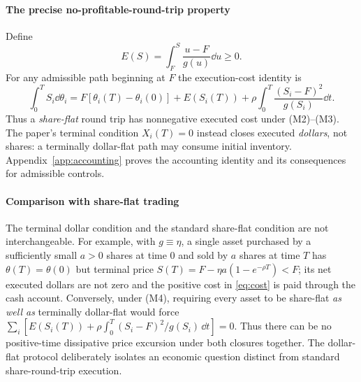 \documentclass[review,hidelinks,onefignum,onetabnum]{siamonline250211}
\begin{document}
\paragraph{The precise no-profitable-round-trip property} Define
\begin{equation}\label{eq:E}
E(S)=\int_F^S\frac{u-F}{g(u)}\dd u\ge0.
\end{equation}
For any admissible path beginning at $F$ the execution-cost identity is
\begin{equation}\label{eq:cost}
\boxed{\int_0^T S_i\dd\theta_i=F[\theta_i(T)-\theta_i(0)]+E(S_i(T))
+\rho\int_0^T\frac{(S_i-F)^2}{g(S_i)}\dd t.}
\end{equation}
Thus a \emph{share-flat} round trip has nonnegative executed cost under (M2)--(M3). The paper's terminal condition $X_i(T)=0$ instead closes executed \emph{dollars}, not shares: a terminally dollar-flat path may consume initial inventory. Appendix~\ref{app:accounting} proves the accounting identity and its consequences for admissible controls.

\paragraph{Comparison with share-flat trading}
The terminal dollar condition and the standard share-flat condition are not interchangeable. For example, with $g\equiv\eta$, a single asset purchased by a sufficiently small $a>0$ shares at time $0$ and sold by $a$ shares at time $T$ has $\theta(T)=\theta(0)$ but terminal price $S(T)=F-\eta a(1-e^{-\rho T})<F$; its net executed dollars are not zero and the positive cost in \eqref{eq:cost} is paid through the cash account. Conversely, under (M4), requiring every asset to be share-flat \emph{as well as} terminally dollar-flat would force $\sum_i[E(S_i(T))+\rho\int_0^T(S_i-F)^2/g(S_i)\,\dd t]=0$. Thus there can be no positive-time dissipative price excursion under both closures together. The dollar-flat protocol deliberately isolates an economic question distinct from standard share-round-trip execution.
\end{document}
